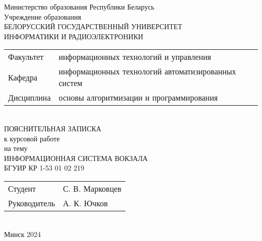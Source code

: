 \begin{titlepage}
  \begin{center}
    Министерство образования Республики Беларусь\\[1em]
    Учреждение образования\\
    БЕЛОРУССКИЙ ГОСУДАРСТВЕННЫЙ УНИВЕРСИТЕТ \\
    ИНФОРМАТИКИ И РАДИОЭЛЕКТРОНИКИ\\[1em]

    \begin{minipage}{\textwidth}
      \begin{flushleft}
        \begin{tabular}{ l l }
          Факультет & информационных технологий и управления\\
          Кафедра & информационных технологий автоматизированных систем\\
          Дисциплина & основы алгоритмизации и программирования
        \end{tabular}
      \end{flushleft}
    \end{minipage}\\[1em]

    \vfill
    {ПОЯСНИТЕЛЬНАЯ ЗАПИСКА}\\
    {к курсовой работе}\\
    {на тему}\\[1em]
    \MakeUppercase{Информационная система вокзала}\\[1em]
    {БГУИР  КР 1-53 01 02 219}\\
        \vfill
    \begin{tabular}{ p{}p{} }
      Студент & С. В. Марковцев \\
      Руководитель & А. К. Ючков \\
    \end{tabular}
    \textbf{\large \MakeUppercase {}}\\[5em]
    {\normalsize Минск 2024}
  \end{center}
\end{titlepage}
